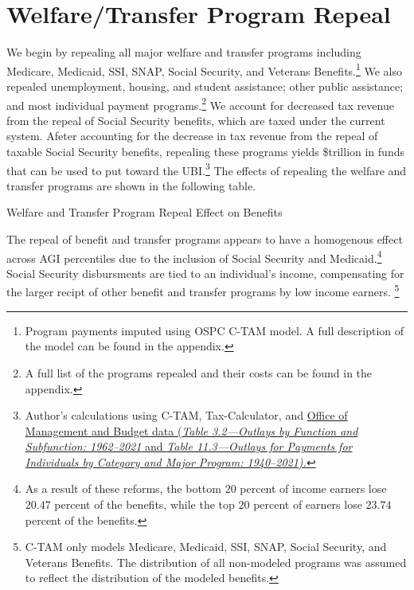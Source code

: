 \documentclass{article}
\begin{document}
\section{Welfare/Transfer Program Repeal}
We begin by repealing all major welfare and transfer programs including Medicare, Medicaid, SSI, SNAP, Social Security, and Veterans Benefits.\footnote{Program payments imputed using OSPC C-TAM model. A full description of the model can be found in the appendix.} We also repealed unemployment, housing, and student assistance; other public assistance; and most individual payment programs.\footnote{A full list of the programs repealed and their costs can be found in the appendix.} We account for decreased tax revenue from the repeal of Social Security benefits, which are taxed under the current system. Afeter accounting for the decrease in tax revenue from the repeal of taxable Social Security benefits, repealing these programs yields \$\axag{}trillion in funds that can be used to put toward the UBI.\footnote{Author's calculations using C-TAM, Tax-Calculator, and \href{https://obamawhitehouse.archives.gov/omb/budget/Historicals}{Office of Management and Budget data (\textit{Table 3.2—Outlays by Function and Subfunction: 1962–2021} and \textit{Table 11.3—Outlays for Payments for Individuals by Category and Major Program: 1940–2021).}}} The effects of repealing the welfare and transfer programs are shown in the following table. 

\begin{table}[H]
\caption{Welfare and Transfer Program Repeal Effect on Benefits}
\begin{center}
\begin{adjustbox}{max width=\textwidth}

\end{adjustbox}
\end{center}
\end{table}

The repeal of benefit and transfer programs appears to have a homogenous effect across AGI percentiles due to the inclusion of Social Security and Medicaid.\footnote{As a result of these reforms, the bottom $20$ percent of income earners lose $20.47$ percent of the benefits, while the top $20$ percent of earners lose $23.74$ percent of the benefits.} Social Security disbursments are tied to an individual's income, compensating for the larger recipt of other benefit and transfer programs by low income earners.
\footnote{C-TAM only models Medicare, Medicaid, SSI, SNAP, Social Security, and Veterans Benefits. The distribution of all non-modeled programs was assumed to reflect the distribution of the modeled benefits.}
\end{document}
